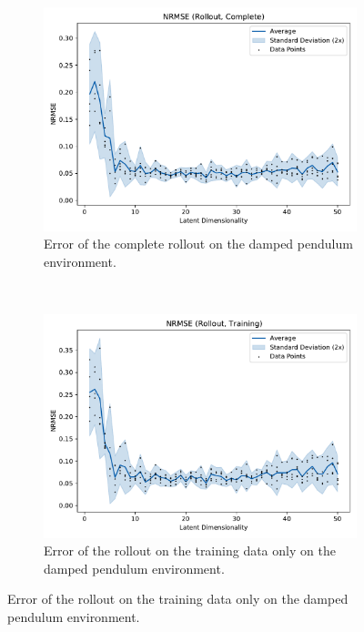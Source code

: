 			\begin{figure}
				\centering
				\begin{subfigure}{0.7\linewidth}
					\centering
					\includegraphics[width=\linewidth]{figures/results/pendulum-damped/latent-dim/comparison-rmse-rollout-normalized-mean-vs-latent-dim.pdf}
					\caption{Error of the complete rollout on the damped pendulum environment.}
					\label{fig:gymPendulumRmseComplete}
				\end{subfigure} \\
				\begin{subfigure}{0.5\linewidth}
					\centering
					\includegraphics[width=\linewidth]{figures/results/pendulum-damped/latent-dim/comparison-rmse-rollout-train-normalized-mean-vs-latent-dim.pdf}
					\caption{Error of the rollout on the training data only on the damped pendulum environment.}

\end{subfigure}
\end{figure}
